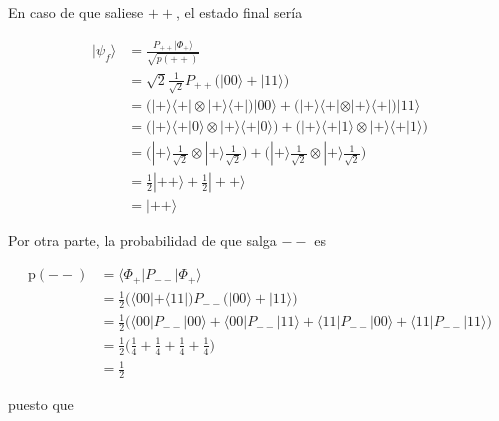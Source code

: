 \documentclass{article}
\begin{document}
En caso de que saliese $++$, el estado final sería

\begin{align*}
  |\psi_f\rangle &= \frac{P_{++}|\Phi_+\rangle}{\sqrt{p(++)}} \\ 
    &= \sqrt{2} \frac{1}{\sqrt{2}} 
      P_{++}\Big(|00\rangle + |11\rangle\Big) \\
    &= \Big( 
      |+\rangle\langle+|\otimes|+\rangle\langle+| 
    \Big)|00\rangle + 
    \Big( 
      |+\rangle\langle+|\otimes|+\rangle\langle+| 
    \Big)|11\rangle \\
    &= \Big(
      |+\rangle\langle +|0\rangle \otimes 
      |+\rangle\langle +|0\rangle\Big
    ) +
    \Big(
      |+\rangle\langle +|1\rangle \otimes 
      |+\rangle\langle +|1\rangle
    \Big)\\
    &= \Big(
      |+\rangle\frac{1}{\sqrt{2}} \otimes 
      |+\rangle\frac{1}{\sqrt{2}}
    \Big) +
    \Big(
      |+\rangle\frac{1}{\sqrt{2}} \otimes 
      |+\rangle\frac{1}{\sqrt{2}}
    \Big) \\
    &= \frac{1}{2}|++\rangle +
      \frac{1}{2}|++\rangle \\
    &= |++\rangle
\end{align*}

Por otra parte, la probabilidad de que salga $--$ es 

\begin{align*}
  \text{p}(--) &= \langle \Phi_+ | P_{--}|\Phi_+ \rangle \\ 
    &= \frac{1}{2}\Big( \langle 00| + \langle 11| \Big)
        P_{--}
        \Big(|00\rangle + |11\rangle\Big) \\
    &= \frac{1}{2}\Big(  
      \langle 00|P_{--}|00\rangle + \langle 00|P_{--}|11\rangle +
      \langle 11|P_{--}|00\rangle + \langle 11|P_{--}|11\rangle
    \Big) \\
    &= \frac{1}{2}\Big(
      \frac{1}{4} + \frac{1}{4} + \frac{1}{4} + \frac{1}{4}
    \Big) \\ 
    &= \frac{1}{2}
\end{align*}

puesto que 
\end{document}
